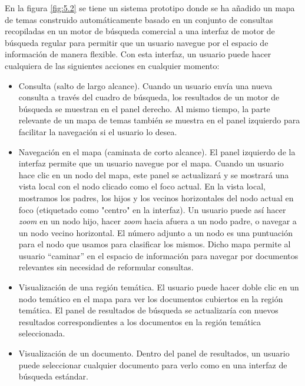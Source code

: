 En la figura \ref{fig:5.2} se tiene un sistema prototipo donde se ha añadido un mapa de temas construido automáticamente basado en un conjunto de consultas recopiladas en un motor de búsqueda comercial a una interfaz de motor de búsqueda regular para permitir que un usuario navegue por el espacio de información de manera flexible. Con esta interfaz, un usuario puede hacer cualquiera de las siguientes acciones en cualquier momento: 
\begin{itemize}
\item Consulta (salto de largo alcance). Cuando un usuario envía una nueva consulta a través del cuadro de búsqueda, los resultados de un motor de búsqueda se muestran en el panel derecho. Al mismo tiempo, la parte relevante de un mapa de temas también se muestra en el panel izquierdo para facilitar la navegación si el usuario lo desea.
\item Navegación en el mapa (caminata de corto alcance). El panel izquierdo de la interfaz permite que un usuario navegue por el mapa. Cuando un usuario hace clic en un nodo del mapa, este panel se actualizará y se mostrará una vista local con el nodo clicado como el foco actual. En la vista local, mostramos los padres, los hijos y los vecinos horizontales del nodo actual en foco (etiquetado como "centro" en la interfaz). Un usuario puede así hacer \textit{zoom} en un nodo hijo, hacer \textit{zoom} hacia afuera a un nodo padre, o navegar a un nodo vecino horizontal. El número adjunto a un nodo es una puntuación para el nodo que usamos para clasificar los mismos. Dicho mapa permite al usuario ``caminar'' en el espacio de información para navegar por documentos relevantes sin necesidad de reformular consultas.
\item Visualización de una región temática. El usuario puede hacer doble clic en un nodo temático en el mapa para ver los documentos cubiertos en la región temática. El panel de resultados de búsqueda se actualizaría con nuevos resultados correspondientes a los documentos en la región temática seleccionada. 
\item Visualización de un documento. Dentro del panel de resultados, un usuario puede seleccionar cualquier documento para verlo como en una interfaz de búsqueda estándar.
\end{itemize}

